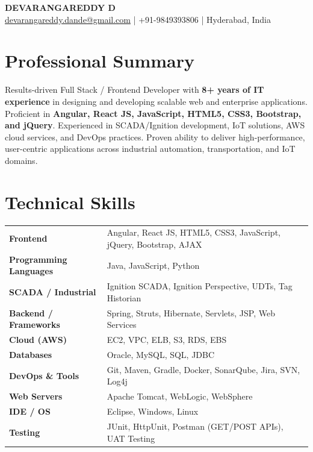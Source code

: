 \documentclass[9.5pt, letterpaper]{article}
\begin{document}
\pagestyle{empty}

\begin{center}
    {\LARGE \textbf{DEVARANGAREDDY D}} \\[4pt]
    \href{mailto:devarangareddy.dande@gmail.com}{devarangareddy.dande@gmail.com} \quad | \quad
    +91-9849393806 \quad | \quad
    Hyderabad, India
\end{center}

\section{Professional Summary}

Results-driven Full Stack / Frontend Developer with \textbf{8+ years of IT experience} in designing and developing scalable web and enterprise applications. Proficient in \textbf{Angular, React JS, JavaScript, HTML5, CSS3, Bootstrap, and jQuery}. Experienced in SCADA/Ignition development, IoT solutions, AWS cloud services, and DevOps practices. Proven ability to deliver high-performance, user-centric applications across industrial automation, transportation, and IoT domains.

\section{Technical Skills}

\begin{tabular}{@{}p{2.2in} p{4.2in}}
\textbf{Frontend} & Angular, React JS, HTML5, CSS3, JavaScript, jQuery, Bootstrap, AJAX \\[2pt]
\textbf{Programming Languages} & Java, JavaScript, Python \\[2pt]
\textbf{SCADA / Industrial} & Ignition SCADA, Ignition Perspective, UDTs, Tag Historian \\[2pt]
\textbf{Backend / Frameworks} & Spring, Struts, Hibernate, Servlets, JSP, Web Services \\[2pt]
\textbf{Cloud (AWS)} & EC2, VPC, ELB, S3, RDS, EBS \\[2pt]
\textbf{Databases} & Oracle, MySQL, SQL, JDBC \\[2pt]
\textbf{DevOps \& Tools} & Git, Maven, Gradle, Docker, SonarQube, Jira, SVN, Log4j \\[2pt]
\textbf{Web Servers} & Apache Tomcat, WebLogic, WebSphere \\[2pt]
\textbf{IDE / OS} & Eclipse, Windows, Linux \\[2pt]
\textbf{Testing} & JUnit, HttpUnit, Postman (GET/POST APIs), UAT Testing \\
\end{tabular}
\end{document}
